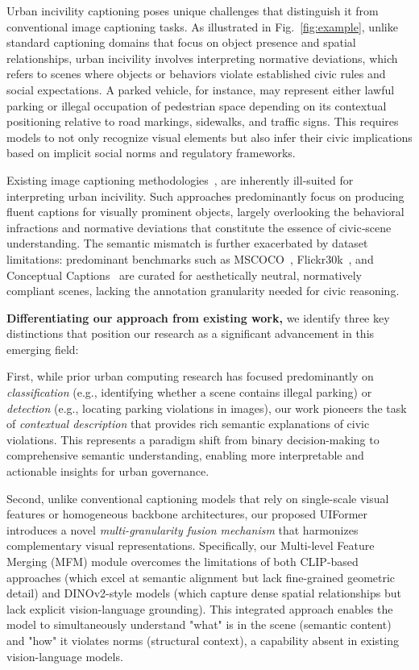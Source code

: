 \documentclass[lettersize,journal]{IEEEtran}
\begin{document}
	Urban incivility captioning poses unique challenges that distinguish it from conventional image captioning tasks. As illustrated in Fig.~\ref{fig:example}, unlike standard captioning domains that focus on object presence and spatial relationships, urban incivility involves interpreting normative deviations, which refers to scenes where objects or behaviors violate established civic rules and social expectations. A parked vehicle, for instance, may represent either lawful parking or illegal occupation of pedestrian space depending on its contextual positioning relative to road markings, sidewalks, and traffic signs. This requires models to not only recognize visual elements but also infer their civic implications based on implicit social norms and regulatory frameworks.
	
	Existing image captioning methodologies~\cite{11299447, 10896876, lu2017knowing, anderson2018bottom, huang2019adaptively}, are inherently ill‑suited for interpreting urban incivility. Such approaches predominantly focus on producing fluent captions for visually prominent objects, largely overlooking the behavioral infractions and normative deviations that constitute the essence of civic‑scene understanding. The semantic mismatch is further exacerbated by dataset limitations: predominant benchmarks such as MSCOCO~\cite{lin2014microsoft}, Flickr30k~\cite{young2014image}, and Conceptual Captions~\cite{sharma2018conceptual} are curated for aesthetically neutral, normatively compliant scenes, lacking the annotation granularity needed for civic reasoning.
	
	\textbf{Differentiating our approach from existing work,} we identify three key distinctions that position our research as a significant advancement in this emerging field:
	
	First, while prior urban computing research has focused predominantly on \emph{classification} (e.g., identifying whether a scene contains illegal parking) or \emph{detection} (e.g., locating parking violations in images), our work pioneers the task of \emph{contextual description} that provides rich semantic explanations of civic violations. This represents a paradigm shift from binary decision-making to comprehensive semantic understanding, enabling more interpretable and actionable insights for urban governance.
	
	
	Second, unlike conventional captioning models that rely on single-scale visual features or homogeneous backbone architectures, our proposed UIFormer introduces a novel \emph{multi-granularity fusion mechanism} that harmonizes complementary visual representations. Specifically, our Multi-level Feature Merging (MFM) module overcomes the limitations of both CLIP-based approaches (which excel at semantic alignment but lack fine-grained geometric detail) and DINOv2-style models (which capture dense spatial relationships but lack explicit vision-language grounding). This integrated approach enables the model to simultaneously understand "what" is in the scene (semantic content) and "how" it violates norms (structural context), a capability absent in existing vision-language models.
	
\end{document}
